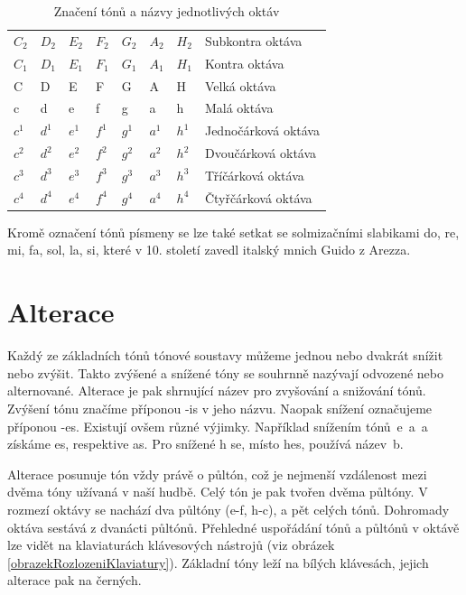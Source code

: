 \begin{table}[]
    \begin{tabular}{ l l l l l l l | l }
        $C_2$ & $D_2$ & $E_2$ & $F_2$ & $G_2$ & $A_2$ & $H_2$ & Subkontra oktáva    \\
        $C_1$ & $D_1$ & $E_1$ & $F_1$ & $G_1$ & $A_1$ & $H_1$ & Kontra oktáva       \\
        C     & D     & E     & F     & G     & A     & H     & Velká oktáva        \\
        c     & d     & e     & f     & g     & a     & h     & Malá oktáva         \\
        $c^1$ & $d^1$ & $e^1$ & $f^1$ & $g^1$ & $a^1$ & $h^1$ & Jednočárková oktáva \\
        $c^2$ & $d^2$ & $e^2$ & $f^2$ & $g^2$ & $a^2$ & $h^2$ & Dvoučárková oktáva  \\
        $c^3$ & $d^3$ & $e^3$ & $f^3$ & $g^3$ & $a^3$ & $h^3$ & Tříčárková oktáva   \\
        $c^4$ & $d^4$ & $e^4$ & $f^4$ & $g^4$ & $a^4$ & $h^4$ & Čtyřčárková oktáva  \\
    \end{tabular}
    \caption{Značení tónů a názvy jednotlivých oktáv}
    \label{tabulkaOktav}
\end{table}

Kromě označení tónů písmeny se lze také setkat se solmizačními slabikami do, re, mi, fa, sol, la, si,
které v 10. století zavedl italský mnich Guido z Arezza\cite{cmiral}.\par    

\section{Alterace}
Každý ze základních tónů tónové soustavy můžeme jednou nebo dvakrát snížit nebo zvýšit.
Takto zvýšené a snížené tóny se souhrnně nazývají odvozené nebo alternované.
Alterace je pak shrnující název pro zvyšování a snižování tónů.
Zvýšení tónu značíme příponou -is v jeho názvu.
Naopak snížení označujeme příponou -es.
Existují ovšem různé výjimky.
Například snížením tónů~e~a~a získáme es, respektive as.
Pro snížené h se, místo hes, používá název~b.\cite{zenkl}\par

Alterace posunuje tón vždy právě o půltón, 
což je nejmenší vzdálenost mezi dvěma tóny užívaná v naší hudbě.
Celý tón je pak tvořen dvěma půltóny. 
V rozmezí oktávy se nachází dva půltóny ({e-f, h-c}), a pět celých tónů.
Dohromady oktáva sestává z dvanácti půltónů.
Přehledné uspořádání tónů a půltónů v oktávě lze vidět na klaviaturách klávesových nástrojů (viz obrázek \ref{obrazekRozlozeniKlaviatury}).
Základní tóny leží na bílých klávesách, jejich alterace pak na černých.\cite{zenkl,cmiral}\par

